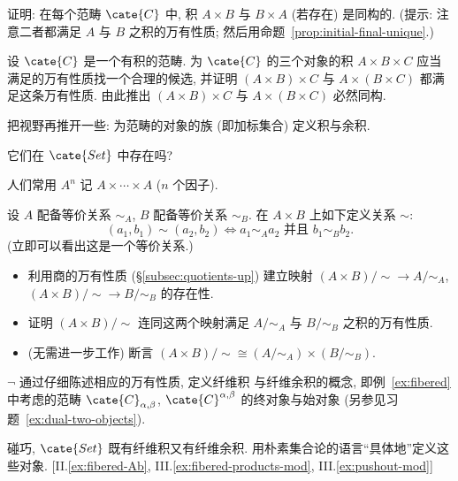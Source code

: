 \begin{prob}
\label{ex:ab-is-ba}
证明: 在每个范畴 $\cate{C}$ 中, 积 $A \times B$ 与 $B \times A$ (若存在) 是同构的. (提示: 注意二者都满足 $A$ 与 $B$ 之积的万有性质; 然后用命题~\ref{prop:initial-final-unique}.)
\end{prob}

\begin{prob}
\label{ex:triple-product}
设 $\cate{C}$ 是一个有积的范畴. 为 $\cate{C}$ 的三个对象的积 $A \times B \times C$ 应当满足的万有性质找一个合理的候选, 并证明 $(A \times B) \times C$ 与 $A \times (B \times C)$ 都满足这条万有性质. 由此推出 $(A \times B) \times C$ 与 $A \times (B \times C)$ 必然同构.
\end{prob}

\begin{prob}
\label{ex:families-products}
把视野再推开一些: 为范畴的对象的族 (即加标集合) 定义积与余积.

它们在 $\cate{Set}$ 中存在吗?

人们常用 $A^n$ 记 $A \times \cdots \times A$ ($n$ 个因子).
\end{prob}

\begin{prob}
\label{ex:quotient-product}
设 $A$ 配备等价关系 $\sim_A$, $B$ 配备等价关系 $\sim_B$. 在 $A \times B$ 上如下定义关系 $\sim$:
\[
(a_1, b_1) \sim (a_2, b_2) \iff a_1 \sim_A a_2 \text{ 并且 } b_1 \sim_B b_2.
\]
(立即可以看出这是一个等价关系.)
\begin{itemize}
	\item 利用商的万有性质 (\S\ref{subsec:quotients-up}) 建立映射 $(A \times B)/{\sim} \to A/{\sim_A}$, $(A \times B)/{\sim} \to B/{\sim_B}$ 的存在性.
	\item 证明 $(A \times B)/{\sim}$ 连同这两个映射满足 $A/{\sim_A}$ 与 $B/{\sim_B}$ 之积的万有性质.
	\item (无需进一步工作) 断言 $(A \times B)/{\sim} \cong (A/{\sim_A}) \times (B/{\sim_B})$.
\end{itemize}
\end{prob}

\begin{prob}
\label{ex:fibered-products}
$\neg$ 通过仔细陈述相应的万有性质, 定义纤维积%
与纤维余积的概念, 即例~\ref{ex:fibered} 中考虑的范畴 $\cate{C}_{\alpha,\beta}$, $\cate{C}^{\alpha,\beta}$ 的终对象与始对象 (另参见习题~\ref{ex:dual-two-objects}).

碰巧, $\cate{Set}$ 既有纤维积又有纤维余积. 用朴素集合论的语言``具体地''定义这些对象. [II.\ref{ex:fibered-Ab}, III.\ref{ex:fibered-products-mod}, III.\ref{ex:pushout-mod}]
\end{prob}
